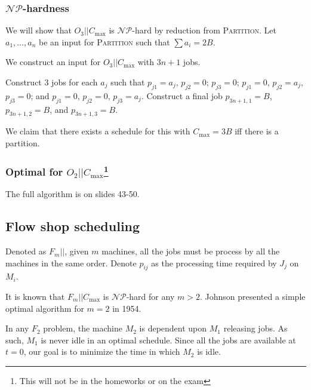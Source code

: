 \documentclass{idc_msc}
\newcommand{\NPclass}{\mathcal{NP}}
\begin{document}
\subsubsection{\texorpdfstring{\(\NPclass\)}{NP}-hardness}

We will show that \(O_3||C_{\max}\) is \(\NPclass\)-hard by reduction from \textsc{Partition}.
Let \(a_1,\ldots,a_n\) be an input for \textsc{Partition} such that \(\sum a_i = 2B\).

We construct an input for \(O_3||C_{\max}\) with \(3n+1\) jobs.

Construct 3 jobs for each \(a_j\) such that \(p_{j1}=a_j\), \(p_{j2} = 0\); \(p_{j3} = 0\); \(p_{j1} = 0\), \(p_{j2} = a_j\), \(p_{j3} = 0\); and \(p_{j1} = 0\), \(p_{j2} = 0\), \(p_{j3} = a_j\).
Construct a final job \(p_{3n+1, 1} = B\), \(p_{3n+1, 2} = B\), and \(p_{3n+1, 3} = B\).

We claim that there exists a schedule for this with \(C_{\max} = 3B\) iff there is a partition.

\subsubsection[Optimal for O\_2||C\_max]{Optimal for \(O_2||C_{\max}\)\footnote{This will not be in the homeworks or on the exam}}

The full algorithm is on slides 43-50.

\subsection{Flow shop scheduling}

Denoted as \(F_m||\), given \(m\) machines, all the jobs must be process by all the machines in the same order.
Denote \(p_{ij}\) as the processing time required by \(J_j\) on \(M_i\).


It is known that \(F_m||C_{\max}\) is \(\NPclass\)-hard for any \(m>2\).
Johnson presented a simple optimal algorithm for \(m=2\) in 1954.

In any \(F_2\) problem, the machine \(M_2\) is dependent upon \(M_1\) releasing jobs.
As such, \(M_1\) is never idle in an optimal schedule.
Since all the jobs are available at \(t=0\), our goal is to minimize the time in which \(M_2\) is idle.
\end{document}
